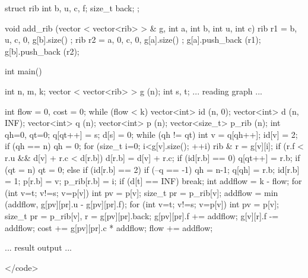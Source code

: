 struct rib {
int b, u, c, f;
size_t back;
};

void add_rib (vector < vector<rib> > & g, int a, int b, int u, int c) {
rib r1 = { b, u, c, 0, g[b].size() };
rib r2 = { a, 0, c, 0, g[a].size() };
g[a].push_back (r1);
g[b].push_back (r2);
}

int main()
{
int n, m, k;
vector < vector<rib> > g (n);
int s, t;
... reading graph ...

int flow = 0, cost = 0;
while (flow < k) {
vector<int> id (n, 0);
vector<int> d (n, INF);
vector<int> q (n);
vector<int> p (n);
vector<size_t> p_rib (n);
int qh=0, qt=0;
q[qt++] = s;
d[s] = 0;
while (qh != qt) {
int v = q[qh++];
id[v] = 2;
if (qh == n) qh = 0;
for (size_t i=0; i<g[v].size(); ++i) {
rib & r = g[v][i];
if (r.f < r.u && d[v] + r.c < d[r.b]) {
d[r.b] = d[v] + r.c;
if (id[r.b] == 0) {
q[qt++] = r.b;
if (qt = n) qt = 0;
}
else if (id[r.b] == 2) {
if (--q == -1) qh = n-1;
q[qh] = r.b;
}
id[r.b] = 1;
p[r.b] = v;
p_rib[r.b] = i;
}
}
}
if (d[t] == INF) break;
int addflow = k - flow;
for (int v=t; v!=s; v=p[v]) {
int pv = p[v]; size_t pr = p_rib[v];
addflow = min (addflow, g[pv][pr].u - g[pv][pr].f);
}
for (int v=t; v!=s; v=p[v]) {
int pv = p[v]; size_t pr = p_rib[v], r = g[pv][pr].back;
g[pv][pr].f += addflow;
g[v][r].f -= addflow;
cost += g[pv][pr].c * addflow;
}
flow += addflow;
}

... result output ...

}</code>